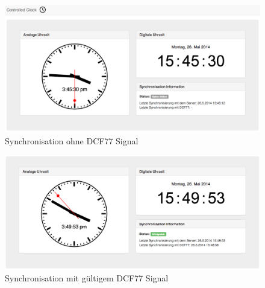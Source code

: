 \begin{figure}[htbp!]
	\caption{Synchronisation ohne DCF77 Signal}
	\centering
		\includegraphics[width=1\textwidth]{./images/screenshots/client_clock_sync_without_dcf77.png}
\end{figure}

\begin{figure}[htbp!]
	\caption{Synchronisation mit gültigem DCF77 Signal}
	\centering
		\includegraphics[width=1\textwidth]{./images/screenshots/client_clock_sync_with_dcf77.png}
\end{figure}
